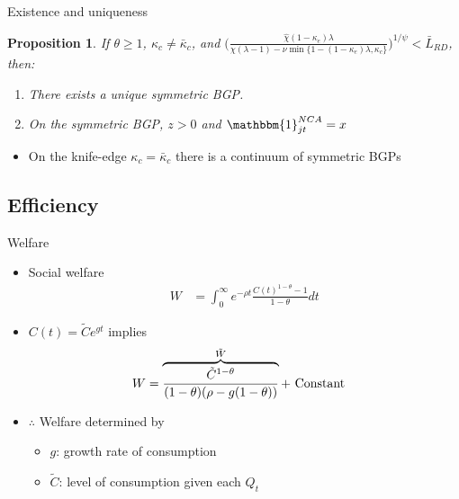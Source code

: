 \documentclass[english,usenames,dvipsnames]{beamer}
\newtheorem{proposition}{Proposition}
\begin{document}
\begin{frame}{Existence and uniqueness}\label{existence_and_uniqueness}\hyperlink{characterizing_BGP}{} 
	\begin{proposition}\label{proposition:purstrategyeq:positiveOI}
		If $\theta \ge 1$, $\kappa_c \ne \bar{\kappa}_c$, and $\Big( \frac{\hat{\chi} (1-\kappa_{e}) \lambda}{\chi(\lambda-1) - \nu \min\{ 1-(1-\kappa_e) \lambda, \kappa_c \}} \Big)^{1/\psi} < \bar{L}_{RD}$, then:
		\begin{enumerate}
			\item There exists a unique symmetric BGP.
			\item On the symmetric BGP, $z > 0$ and $\mathbbm{1}^{NCA}_{jt} = x$
		\end{enumerate}
	\end{proposition}
	\begin{itemize}
		\item On the knife-edge $\kappa_c = \bar{\kappa}_c$ there is a continuum of symmetric BGPs
	\end{itemize}
\end{frame}

\subsection{Efficiency}

\begin{frame}{Welfare}\label{welfare}
	\hyperlink{reducing_kappa_c_table}{}
	\begin{itemize}
		\item Social welfare
		\begin{align*}
		W &= \int_0^{\infty} e^{-\rho t} \frac{C(t)^{1-\theta} - 1}{1-\theta} dt
		\end{align*}
		\item $C(t) = \tilde{C} e^{gt}$ implies
		\begin{align*}
		W &= \overbrace{\frac{\tilde{C}^{1-\theta}}{(1-\theta)(\rho - g(1-\theta))}}^{\mathclap{\tilde{W}}} + \text{ Constant} 
		\end{align*}
		\item $\therefore$ Welfare determined by
		\begin{itemize}
			\item $g$: growth rate of consumption 
			\item $\tilde{C}$: level of consumption given each $Q_t$ 
		\end{itemize}
	\end{itemize}
\end{frame}
\end{document}
